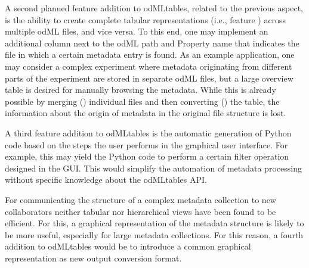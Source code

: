 A second planned feature addition to odMLtables, related to the previous aspect, is the ability to create complete tabular representations (i.e., feature \fconvert) across multiple odML files, and vice versa. To this end, one may implement an additional column next to the odML path and Property name that indicates the file in which a certain metadata entry is found. As an example application, one may consider a complex experiment where metadata originating from different parts of the experiment are stored in separate odML files, but a large overview table is desired for manually browsing the metadata. While this is already possible by merging (\fmerge) individual files and then converting (\fconvert) the table, the information about the origin of metadata in the original file structure is lost.

A third feature addition to odMLtables is the automatic generation of Python code based on the steps the user performs in the graphical user interface. For example, this may yield the Python code to perform a certain filter operation designed in the GUI. This would simplify the automation of metadata processing without specific knowledge about the odMLtables API.

For communicating the structure of a complex metadata collection to new collaborators neither tabular nor hierarchical views have been found to be efficient. For this, a graphical representation of the metadata structure is likely to be more useful, especially for large metadata collections. For this reason, a fourth addition to odMLtables would be to introduce a common graphical representation as new output conversion format.

